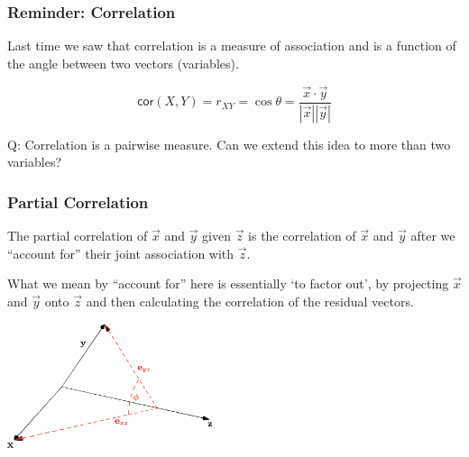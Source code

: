 \documentclass{beamer}
\begin{document}
\begin{frame}
  \frametitle{Reminder: Correlation}

Last time we saw that correlation is a measure of association and is a function of the angle between two vectors (variables).

\begin{center}

\end{center}

\[
\mathsf{cor}(X,Y) = r_{XY} = \cos \theta = \frac{\vec{x} \cdot \vec{y}}{|\vec{x}||\vec{y}|}
\]


\alert{Q: Correlation is a pairwise measure. Can we extend this idea to more than two variables?}
\end{frame}



\begin{frame}
  \frametitle{Partial Correlation}

The partial correlation of $\vec{x}$ and $\vec{y}$ given $\vec{z}$ is the correlation of $\vec{x}$ and $\vec{y}$ after we ``account for'' their joint association with $\vec{z}$.  

\medskip

What we mean by ``account for'' here is essentially `to factor out', by projecting $\vec{x}$ and $\vec{y}$ onto $\vec{z}$ and then calculating the correlation of the residual vectors.


\begin{center}
\includegraphics[width=6cm]{partial-corr.pdf}
\end{center}



\end{frame}
\end{document}
